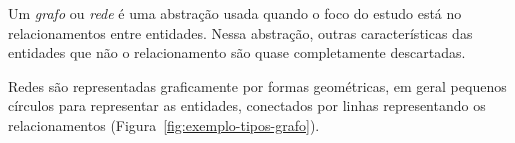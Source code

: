 \documentclass[12pt,a4paper]{article}
\theoremstyle{hypo}
\begin{document}
Um \textit{grafo} ou \textit{rede} é uma abstração usada quando o foco do estudo está no relacionamentos entre entidades. Nessa abstração, outras características das entidades que não o relacionamento são quase completamente descartadas.

Redes são representadas graficamente por formas geométricas, em geral pequenos círculos para representar as entidades, conectados por linhas representando os relacionamentos (Figura~\ref{fig:exemplo-tipos-grafo}).

\begin{figure}[ht]
    \centering
\end{figure}
\end{document}
